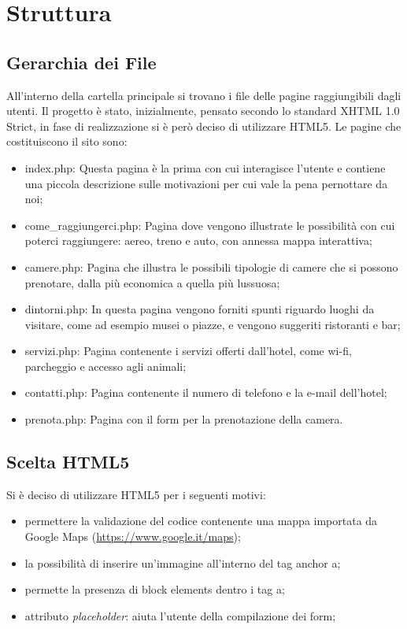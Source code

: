 \section{Struttura}
\subsection{Gerarchia dei File}
All'interno della cartella principale si trovano i file delle pagine raggiungibili dagli utenti. Il progetto è stato, inizialmente, pensato secondo lo standard XHTML 1.0 Strict, in fase di realizzazione si è però deciso di utilizzare HTML5. 
Le pagine che costituiscono il sito sono:
\begin{itemize} 
\item index.php: Questa pagina è la prima con cui interagisce l'utente e contiene una piccola descrizione sulle motivazioni per cui vale la pena pernottare da noi;
\item come_raggiungerci.php: Pagina dove vengono illustrate le possibilità con cui poterci raggiungere: aereo, treno e auto, con annessa mappa interattiva;
\item camere.php: Pagina che illustra le possibili tipologie di camere che si possono prenotare, dalla più economica a quella più lussuosa;
\item dintorni.php: In questa pagina vengono forniti spunti riguardo luoghi da visitare, come ad esempio musei o piazze, e vengono suggeriti ristoranti e bar;
\item servizi.php: Pagina contenente i servizi offerti dall'hotel, come wi-fi, parcheggio e accesso agli animali;
\item contatti.php: Pagina contenente il numero di telefono e la e-mail dell'hotel;
\item prenota.php: Pagina con il form per la prenotazione della camera.
\end{itemize}
\subsection{Scelta HTML5}
Si è deciso di utilizzare HTML5 per i seguenti motivi:
\begin{itemize}
\item permettere la validazione del codice contenente una mappa importata da Google Maps (\underline{\color{Blue}https://www.google.it/maps});
\item la possibilità di inserire un'immagine all'interno del tag anchor a;
\item permette la presenza di block elements dentro i tag a;
\item attributo \textit{placeholder}: aiuta l'utente della compilazione dei form;
\end{itemize} 
